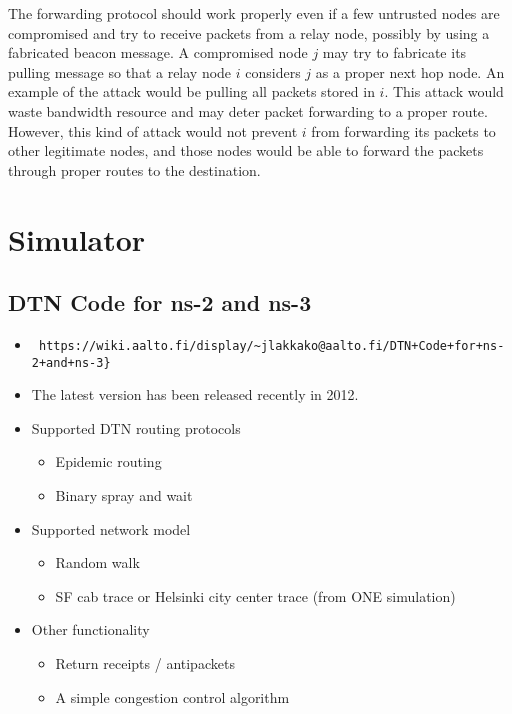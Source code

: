 \documentclass[11pt]{article}
\begin{document}
The forwarding protocol should work properly even if a few untrusted nodes are compromised and try to receive packets from a relay node, possibly by using a fabricated beacon message. 
A compromised node $j$ may try to fabricate its pulling message so that a relay node $i$ considers $j$ as a proper next hop node. 
An example of the attack would be pulling all packets stored in $i$. 
This attack would waste bandwidth resource and may deter packet forwarding to a proper route. 
However, this kind of attack would not prevent $i$ from forwarding its packets to other legitimate nodes, and those nodes would be able to forward the packets through proper routes to the destination.


\section{Simulator}
\subsection{DTN Code for ns-2 and ns-3}
\begin{itemize}
\item \begin{verbatim} https://wiki.aalto.fi/display/~jlakkako@aalto.fi/DTN+Code+for+ns-2+and+ns-3} \end{verbatim}
\item The latest version has been released recently in 2012.
\item Supported DTN routing protocols
  \begin{itemize}
  \item Epidemic routing
  \item Binary spray and wait
  \end{itemize}

\item Supported network model
  \begin{itemize}
  \item Random walk
  \item SF cab trace or Helsinki city center trace (from ONE simulation)
  \end{itemize}

\item Other functionality
  \begin{itemize}
  \item Return receipts / antipackets
  \item A simple congestion control algorithm
  \end{itemize}  
\end{itemize}
\end{document}
